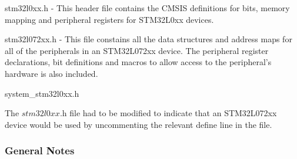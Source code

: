 \begin{compactitem}
	\item stm32l0xx.h - This header file contains the \ac{CMSIS} definitions for bits, memory mapping and peripheral registers for STM32L0xx devices.
	\item stm32l072xx.h - This file constains all the data structures and address maps for all of the peripherals in an STM32L072xx device. The peripheral register declarations, bit definitions and macros to allow access to the peripheral's hardware is also included.
	\item system\_stm32l0xx.h
\end{compactitem}

The $\textit{stm32l0xx.h}$ file had to be modified to indicate that an STM32L072xx device would be used by uncommenting the relevant define line in the file.

\subsubsection{General Notes}


